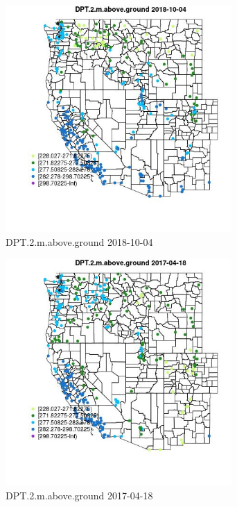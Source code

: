 \begin{figure} 
\centering  
\includegraphics[width=0.77\textwidth]{Code_Outputs/Report_ML_input_PM25_Step4_part_f_de_duplicated_aves_prioritize_24hr_obswNAs_MapObsDPT2maboveground2018-10-04.jpg} 
\caption{\label{fig:Report_ML_input_PM25_Step4_part_f_de_duplicated_aves_prioritize_24hr_obswNAsMapObsDPT2maboveground2018-10-04}DPT.2.m.above.ground 2018-10-04} 
\end{figure} 
 

\begin{figure} 
\centering  
\includegraphics[width=0.77\textwidth]{Code_Outputs/Report_ML_input_PM25_Step4_part_f_de_duplicated_aves_prioritize_24hr_obswNAs_MapObsDPT2maboveground2017-04-18.jpg} 
\caption{\label{fig:Report_ML_input_PM25_Step4_part_f_de_duplicated_aves_prioritize_24hr_obswNAsMapObsDPT2maboveground2017-04-18}DPT.2.m.above.ground 2017-04-18} 
\end{figure} 
 

